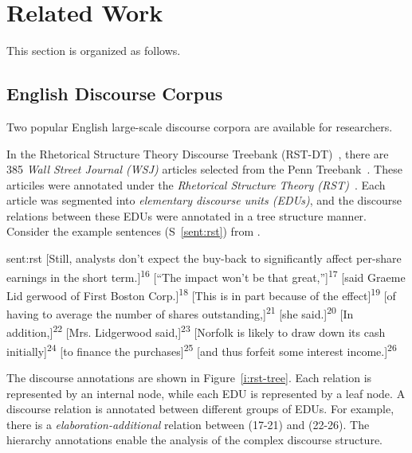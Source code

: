 %
%
%
\chapter{Related Work}
\label{c:related}

This section is organized as follows.

\section{English Discourse Corpus}

Two popular English large-scale discourse corpora are available for researchers.

In the Rhetorical Structure Theory Discourse Treebank (RST-DT)~\citep{Carlson01building},
there are 385 \textit{Wall Street Journal (WSJ)} articles selected from
the Penn Treebank~\citep{marcus1993building}. These articiles were annotated under
the \textit{Rhetorical Structure Theory (RST)}~\citep{mann-thompson88}.
Each article was segmented into \textit{elementary discourse units (EDUs)}, and the
discourse relations between these EDUs were annotated in a tree structure manner.
Consider the example sentences (S~\ref{sent:rst})  from \cite{Carlson01building}.

\begin{sent}{sent:rst}{}
[Still, analysts don't expect the buy-back to significantly affect per-share earnings in the short
term.]\textsuperscript{16} [``The impact won't be that great,'']\textsuperscript{17}
[said Graeme Lid gerwood of First Boston Corp.]\textsuperscript{18}
[This is in part because of the effect]\textsuperscript{19}
[of having to average the number of shares outstanding,]\textsuperscript{21}
[she said.]\textsuperscript{20} [In addition,]\textsuperscript{22}
[Mrs. Lidgerwood said,]\textsuperscript{23}
[Norfolk is likely to draw down its cash initially]\textsuperscript{24}
[to finance the purchases]\textsuperscript{25}
[and thus forfeit some interest income.]\textsuperscript{26}
\end{sent}

The discourse annotations are shown in Figure~\ref{i:rst-tree}. Each relation is represented
by an internal node, while each EDU is represented by a leaf node. A discourse relation is
annotated between different groups of EDUs. For example, there is a \textit{elaboration-additional}
relation between (17-21) and (22-26). The hierarchy annotations enable the analysis of
the complex discourse structure.

